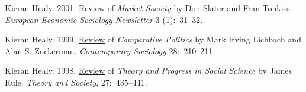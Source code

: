 \documentclass[11pt,article,oneside]{memoir}
\begin{document}
\ind  Kieran Healy. 2001. Review of \emph{Market Society} by Don Slater and Fran Tonkiss. \emph{European Economic Sociology Newsletter} 3 (1):~31--32.


\ind  Kieran Healy. 1999. \href{http://links.jstor.org/sici?sici=0094-3061%28199903%2928%3A2%3C210%3ACPRCAS%3E2.0.CO%3B2-C}{Review} of \emph{Comparative Politics} by Mark Irving Lichbach and Alan S.
Zuckerman. \emph{Contemporary Sociology} 28:~210--211.


\ind  Kieran Healy. 1998. \href{http://www.kieranhealy.org/files/reviews/rule.pdf}{Review} of \emph{Theory and Progress in Social Science} by James Rule.  \emph{Theory
  and Society}, 27:~435--441.

 
 \bigskip

%
%
% 
%
% 
%
%
%
%
%
%
%
%
%
%
%
%
\end{document}

